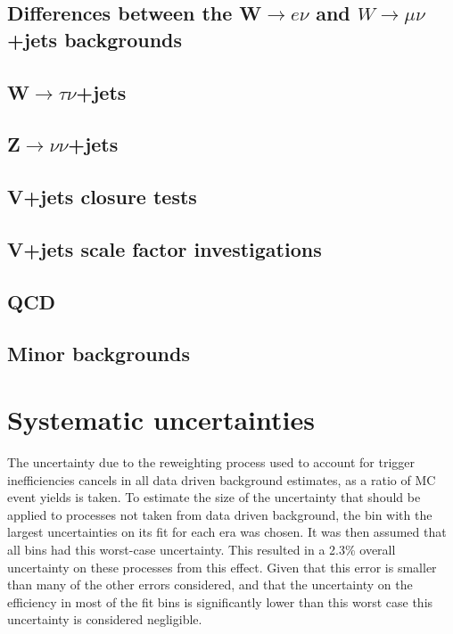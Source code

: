 \subsection{Differences between the W$\rightarrow e\nu$ and $W\rightarrow\mu\nu$ +jets backgrounds}%
\label{sec:parkedenumunudiff}

\subsection{W$\rightarrow \tau\nu$+jets}%
\label{sec:parkedwtaunu}

\subsection{Z$\rightarrow \nu\nu$+jets}%
\label{sec:parkedznunu}



\subsection{V+jets closure tests}%
\label{sec:parkedclosure}

\subsection{V+jets scale factor investigations}%
\label{sec:parkedscalefactors}

\subsection{QCD}%
\label{sec:parkedQCD}

\subsection{Minor backgrounds}%
\label{sec:parkedminor}

\section{Systematic uncertainties}%
\label{sec:parkedsyst}
The uncertainty due to the reweighting process used to account for trigger inefficiencies cancels in all data driven background estimates, as a ratio of \ac{MC} event yields is taken. To estimate the size of the uncertainty that should be applied to processes not taken from data driven background, the bin with the largest uncertainties on its fit for each era was chosen. It was then assumed that all bins had this worst-case uncertainty. This resulted in a 2.3\% overall uncertainty on these processes from this effect. Given that this error is smaller than many of the other errors considered, and that the uncertainty on the efficiency in most of the fit bins is significantly lower than this worst case this uncertainty is considered negligible.



